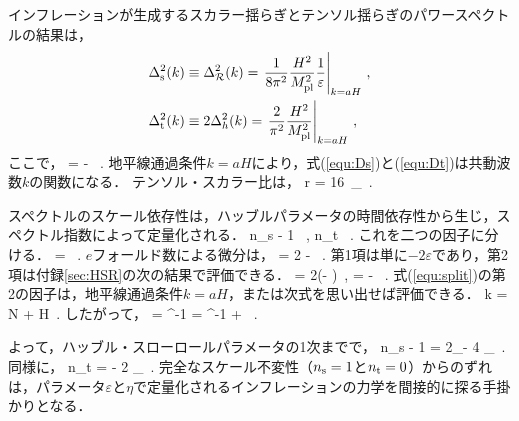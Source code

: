 


インフレーションが生成するスカラー揺らぎとテンソル揺らぎのパワースペクトルの結果は，
\begin{align}
\label{equ:Ds}
\Delta^2_{\rm s}(k)  &\equiv \Delta^2_{\cal R}(k)= \left. \frac{1}{8\pi^2} \frac{H^2}{M_{\rm pl}^2} \frac{1}{\varepsilon} \right|_{k=aH} \, , \\
\label{equ:Dt}
\Delta^2_{\rm t}(k) & \equiv 2 \Delta^2_h(k) = \left. \frac{2}{\pi^2} \frac{H^2}{M_{\rm pl}^2} \right|_{k=aH} \, ,
\end{align}
ここで，%
\beq
\varepsilon = -  \, .
\eeq
地平線通過条件$k=aH$により，式(\ref{equ:Ds})と(\ref{equ:Dt})は共動波数$k$の関数になる．
テンソル・スカラー比は，
\beq
r \equiv {} =  16\, \varepsilon_\star \, .
\eeq




スペクトルのスケール依存性は，ハッブルパラメータの時間依存性から生じ，スペクトル指数によって定量化される．
\beq
n_{\rm s} - 1  \equiv {} \, , \qquad n_{\rm  t}   \equiv {}\, .
\eeq  
これを二つの因子に分ける．
\beq
\label{equ:split}
 =  \times {} \, .
\eeq
$e$フォールド数による微分は，
\beq
  = 2  - \, .
\eeq
第1項は単に$-2 \varepsilon$であり，第2項は付録\ref{sec:HSR}の次の結果で評価できる．
\beq
{} = 2(\varepsilon - \eta)\, , \qquad {} \quad \eta = - \, .
\eeq
式(\ref{equ:split})の第2の因子は，地平線通過条件$k = a H$，または次式を思い出せば評価できる．
\beq
\ln k = N + \ln H\, .
\eeq
したがって，
\beq
{}= ^{-1}  = ^{-1} + \varepsilon\, .
\eeq

よって，ハッブル・スローロールパラメータの1次までで，
\beq
n_{\rm s} - 1 =  2\eta_\star - 4 \varepsilon_\star\, .
\eeq
同様に，
\beq
n_{\rm t} = - 2 \varepsilon_\star\, .
\eeq
完全なスケール不変性（$n_{\rm s} = 1$と$n_{\rm t}=0$）からのずれは，パラメータ$\varepsilon$と$\eta$で定量化されるインフレーションの力学を間接的に探る手掛かりとなる．


